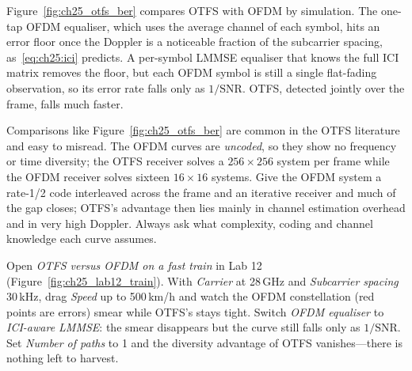 Figure~\ref{fig:ch25_otfs_ber} compares OTFS with OFDM by simulation. The one-tap OFDM equaliser,
which uses the average channel of each symbol, hits an error floor once the Doppler is a noticeable
fraction of the subcarrier spacing, as~\eqref{eq:ch25:ici} predicts. A per-symbol LMMSE equaliser
that knows the full ICI matrix removes the floor, but each OFDM symbol is still a single flat-fading
observation, so its error rate falls only as $1/\text{SNR}$. OTFS, detected jointly over the frame,
falls much faster.

\begin{pitfall}
Comparisons like Figure~\ref{fig:ch25_otfs_ber} are common in the OTFS literature and easy to
misread. The OFDM curves are \emph{uncoded}, so they show no frequency or time diversity; the OTFS
receiver solves a $256\times256$ system per frame while the OFDM receiver solves sixteen $16\times16$
systems. Give the OFDM system a rate-1/2 code interleaved across the frame and an iterative receiver
and much of the gap closes; OTFS's advantage then lies mainly in channel estimation overhead and in
very high Doppler. Always ask what complexity, coding and channel knowledge each curve assumes.
\end{pitfall}


\begin{tryit}
Open \emph{OTFS versus OFDM on a fast train} in Lab 12 (Figure~\ref{fig:ch25_lab12_train}). With
\emph{Carrier} at 28\,GHz and \emph{Subcarrier spacing} 30\,kHz, drag \emph{Speed} up to 500\,km/h and
watch the OFDM constellation (red points are errors) smear while OTFS's stays tight. Switch
\emph{OFDM equaliser} to \emph{ICI-aware LMMSE}: the smear disappears but the curve still falls only
as $1/\text{SNR}$. Set \emph{Number of paths} to 1 and the diversity advantage of OTFS vanishes---there
is nothing left to harvest.
\end{tryit}


